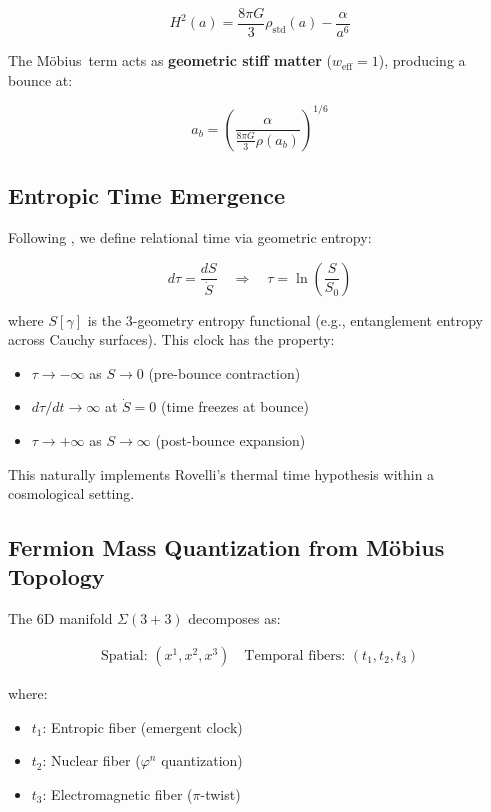 \documentclass[12pt]{article}
\newcommand{\Moebius}{M\"obius}
\newcommand{\SigMoeb}{\Sigma\text{--}\Moebius}
\begin{document}
\begin{equation}
\boxed{H^2(a) = \frac{8\pi G}{3}\rho_{\text{std}}(a) - \frac{\alpha}{a^6}}
\end{equation}

The \SigMoeb\ term acts as \textbf{geometric stiff matter} ($w_{\text{eff}} = 1$), producing a bounce at:

\begin{equation}
a_b = \left(\frac{\alpha}{\frac{8\pi G}{3}\rho(a_b)}\right)^{1/6}
\end{equation}

\subsection{Entropic Time Emergence}

Following \cite{rovelli2004,thooft1996}, we define relational time via geometric entropy:

\begin{equation}
\boxed{d\tau = \frac{dS}{\dot{S}} \quad \Rightarrow \quad \tau = \ln\left(\frac{S}{S_0}\right)}
\end{equation}

where $S[\gamma]$ is the 3-geometry entropy functional (e.g., entanglement entropy across Cauchy surfaces). This clock has the property:

\begin{itemize}
\item $\tau \to -\infty$ as $S \to 0$ (pre-bounce contraction)
\item $d\tau/dt \to \infty$ at $\dot{S} = 0$ (time freezes at bounce)
\item $\tau \to +\infty$ as $S \to \infty$ (post-bounce expansion)
\end{itemize}

This naturally implements Rovelli's thermal time hypothesis \cite{rovelli1993} within a cosmological setting.

\subsection{Fermion Mass Quantization from M\"obius Topology}

The 6D manifold $\Sigma(3+3)$ decomposes as:

\begin{align}
\text{Spatial: } (x^1, x^2, x^3) \quad \text{Temporal fibers: } (t_1, t_2, t_3)
\end{align}

where:
\begin{itemize}
\item \textbf{$t_1$}: Entropic fiber (emergent clock)
\item \textbf{$t_2$}: Nuclear fiber ($\varphi^n$ quantization)
\item \textbf{$t_3$}: Electromagnetic fiber ($\pi$-twist)
\end{itemize}
\end{document}
